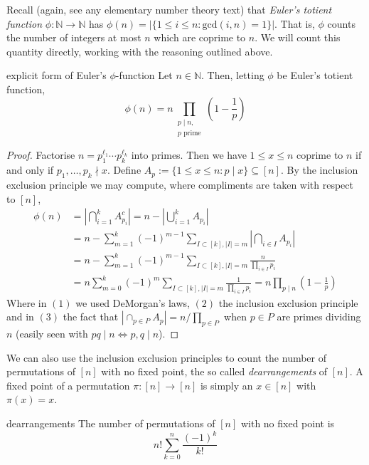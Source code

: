 \documentclass{article}
\begin{document}
Recall (again, see any elementary number theory text) that {\it Euler's totient function} $\phi: \mathbb{N} \to \mathbb{N}$
has $\phi(n) = |\{1 \leq i \leq n : \text{gcd}(i, n) = 1\}|$. That is, $\phi$ counts the number of integers at most $n$ 
which are coprime to $n$. We will count this quantity directly, working with the reasoning outlined above.

\begin{proposition}[]{explicit form of Euler's $\phi$-function}
    Let $n \in \mathbb{N}$. Then, letting $\phi$ be Euler's totient function, 
    \[\phi(n) = n \! \! \! \prod_{\substack{p \mid n, \\ p \text{ prime}}} \! \! \! \left(1 - \frac{1}{p}\right)\]
\end{proposition}

\begin{proof}
    Factorise $n = p_1^{\ell_1} \cdots p_k^{\ell_k}$ into primes. Then we have $1 \leq x \leq n$ coprime to $n$ 
    if and only if $p_1, \dots, p_k \nmid x$. Define $A_p := \{1 \leq x \leq n : p \mid x\} \subseteq [n]$. 
    By the inclusion exclusion principle we may compute, where compliments are taken with respect to $[n]$, 
    \begin{align*}
        \phi(n) &= \left|\bigcap_{i=1}^kA_{p_i}^c\right| = n - \left|\bigcup_{i=1}^k A_{p_i}\right| \tag{1}\\
        &= n - \sum_{m = 1}^k (-1)^{m-1} \sum_{I \subset [k], |I| = m}\left|\bigcap_{i \in I}A_{p_i}\right| \tag{2}\\
        &= n - \sum_{m = 1}^k (-1)^{m-1} \sum_{I \subset [k], |I| = m}\frac{n}{\prod_{i \in I}p_i} \tag{3}\\
        &= n\sum_{m = 0}^k (-1)^{m} \sum_{I \subset [k], |I| = m}\frac{1}{\prod_{i \in I}p_i} 
        = n\prod_{p \mid n}\left(1 - \frac{1}{p}\right)
    \end{align*}
    Where in $(1)$ we used DeMorgan's laws, $(2)$ the inclusion exclusion principle and in $(3)$ the fact that 
    $|\cap_{p \in P}A_p| = n/\prod_{p \in P}$ when $p \in P$ are primes dividing $n$ (easily seen with 
    $pq \mid n \Leftrightarrow p,q \mid n$).
\end{proof}

We can also use the inclusion exclusion principles to count the number of permutations of $[n]$ with no fixed point, 
the so called {\it dearrangements} of $[n]$. A fixed point of a permutation $\pi:[n] \to [n]$ is simply an 
$x \in [n]$ with $\pi(x) = x$. 

\begin{proposition}[]{dearrangements}
    The number of permutations of $[n]$ with no fixed point is \[n!\sum_{k = 0}^n \frac{(-1)^k}{k!}\]
\end{proposition}
\end{document}
